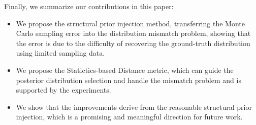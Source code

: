 Finally, we summarize our contributions in this paper:
\begin{itemize}
    \item We propose the structural prior injection method, transferring the Monte Carlo sampling error into the distribution mismatch problem, showing that the error is due to the difficulty of recovering the ground-truth distribution using limited sampling data.
    \item We propose the Statictics-based Distance metric, which can guide the posterior distribution selection and handle the mismatch problem and is supported by the experiments.
    \item We show that the improvements derive from the reasonable structural prior injection, which is a promising and meaningful direction for future work.
\end{itemize}